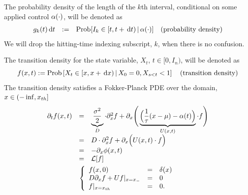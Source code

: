 \documentclass{article}
\begin{document}
The probability density of the length of the $k$th interval,
conditional on some applied control ${\alpha}(\cdot)$, will be denoted as
\begin{equation} 
\begin{array}{rcll} 
g_k(t) \, \mathrm{d} t &:=& \operatorname{Prob}[I_{k} \in [t, t + \, \mathrm{d} t)  \,|\,
 {\alpha}(\cdot)] &
 \textrm{(probability density)} 
\end{array}
\label{eq:ISI_distribution_functions}
\end{equation}
We will drop the hitting-time indexing subscript, $k$, when there is no
confusion. 

The transition density for the state variable, $X_t$, $t \in [0, I_{n})$, will
be denoted as
\begin{equation}
f(x,t) := \operatorname{Prob} \left[X_{t} \in [x, x+ \, \mathrm{d} x)  \,|\,
 X_0 = 0, X_{s < t} < 1  \right]  \quad
 \textrm{(transition density)}
 \label{eq:transition_distribution}
\end{equation} 
The transition density satisfies a Fokker-Planck PDE over the domain, $x \in
(-\inf, { x_{th} }]$
\begin{equation}
\begin{gathered}
\begin{array}{lcl}
	{\partial}_t f (x,t) &=&
					\underbrace{\frac{{\sigma }^2 }{2}}_{D}\cdot {\partial}^2_x f 
					+ {\partial}_x \Bigg(  
					\underbrace{\Big( \frac 1{{ \tau }} (x-{\mu }) - {\alpha}(t) \Big)}_{U(x,t)}  \cdot  f
					\Bigg)
					\\
					&=&
					D \cdot {\partial}^2_x f +
					{\partial}_x  \Big( U(x,t) \cdot f \Big)
					\\
					&=&
					- {\partial}_x \phi(x,t)
					\\
					&=&
					{ \mathcal{L} }[f] 
					\end{array}
	\\
	\left\{ \begin{array}{lcl}
	 f (x,0) &=& \delta(x)
	\\
	D {\partial}_xf + U f |_{x={ x_{-} }} &=& 0 
	\\
	f |_{x={ x_{th} }} &=& 0.
	\end{array} \right.
\label{eq:FP_pde_OU_absorbBC}
\end{gathered}
\end{equation}
\end{document}
